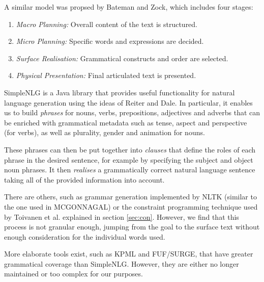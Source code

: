 A similar model was propsed by Bateman and Zock\cite{mitkov2003oxford}, which includes four stages:
\begin{enumerate}
\item{\textit{Macro Planning:} Overall content of the text is structured.}
\item{\textit{Micro Planning:} Specific words and expressions are decided.}
\item{\textit{Surface Realisation:} Grammatical constructs and order are selected.}
\item{\textit{Physical Presentation:} Final articulated text is presented.}
\end{enumerate}

SimpleNLG\cite{gatt2009simplenlg} is a Java library that provides useful functionality for natural language generation using the ideas of Reiter and Dale. In particular, it enables us to build \textit{phrases} for nouns, verbs, prepositions, adjectives and adverbs that can be enriched with grammatical metadata such as tense, aspect and perspective (for verbs), as well as plurality, gender and animation for nouns.

These phrases can then be put together into \textit{clauses} that define the roles of each phrase in the desired sentence, for example by specifying the subject and object noun phrases. It then \textit{realises} a grammatically correct natural language sentence taking all of the provided information into account.

There are others, such as grammar generation implemented by NLTK (similar to the one used in MCGONNAGAL) or the constraint programming technique used by Toivanen et al. explained in section \ref{sec:con}. However, we find that this process is not granular enough, jumping from the goal to the surface text without enough consideration for the individual words used.

More elaborate tools exist, such as KPML\cite{bateman1997enabling} and FUF\cite{elhadad1989fuf}/SURGE\cite{elhadad1996overview}, that have greater grammatical coverage than SimpleNLG. However, they are either no longer maintained or too complex for our purposes.




